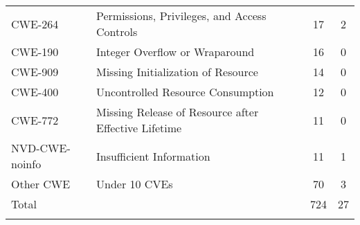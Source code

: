 \begin{table}[t]
{\begin{tabular}{llcc}
      CWE-264 	&Permissions, Privileges, and Access Controls	&17	&2\\
      CWE-190 	&Integer Overflow or Wraparound	&16	&0\\
      CWE-909 	&Missing Initialization of Resource	&14	&0\\
      CWE-400 	&Uncontrolled Resource Consumption	&12	&0\\
      CWE-772 	&Missing Release of Resource after Effective Lifetime	&11	&0\\
      NVD-CWE-noinfo 	&Insufficient Information	&11	&1\\
      \hline \noalign{\smallskip}
      Other CWE & Under 10 CVEs & 70&3\\
      \hline \noalign{\smallskip}
      Total & & 724 & 27\\
      \hline \noalign{\smallskip}

    \end{tabular}
  }
    \label{tb:kernel_vulnerability_affection}
  \end{table}
  
